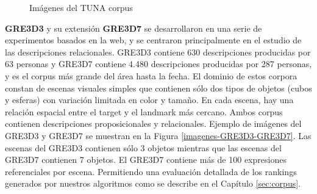 \begin{figure}[!ht]
\begin{subfigure}{.5\textwidth}
\caption{}
\label{fig-TUNA-people}
\end{subfigure}
\caption{Im\'agenes del TUNA corpus}\label{imagenes-tuna}
\end{figure}


\label{sec:corpusGRE}
{\bf GRE3D3} y su extensi\'on {\bf GRE3D7} \cite{gre3d3,gre3d7} se desarrollaron en una serie de experimentos basados en la web, y se centraron principalmente en el estudio de las descripciones relacionales. GRE3D3 contiene 630 descripciones producidas por 63 personas y GRE3D7 contiene 4.480 descripciones producidas por 287 personas, y es el corpus m\'as grande del \'area hasta la fecha. El dominio de estos corpora constan de escenas visuales simples que contienen s\'olo dos tipos de objetos (cubos y esferas) con variaci\'on limitada en color y tama\~no. En cada escena, hay una relaci\'on espacial entre el target y el landmark m\'as cercano. Ambos corpus contienen descripciones proposicionales y relacionales. Ejemplo de im\'agenes del GRE3D3 y GRE3D7 se muestran en la Figura \ref{imagenes-GRE3D3-GRE3D7}. Las escenas del GRE3D3 contienen s\'olo 3 objetos mientras que las escenas del GRE3D7 contienen 7 objetos. El GRE3D7 contiene m\'as de 100 expresiones referenciales por escena. Permitiendo una evaluaci\'on detallada de los rankings generados por nuestros algoritmos como se describe en el Cap\'itulo \ref{sec:corpus}.\\

